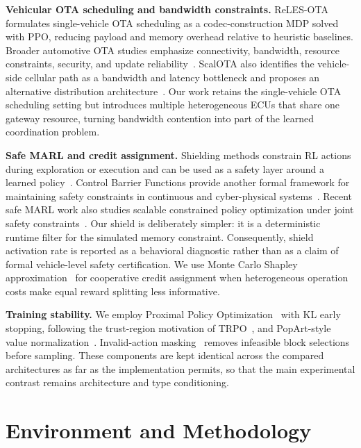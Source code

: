 \documentclass[conference]{IEEEtran}
\begin{document}
\textbf{Vehicular OTA scheduling and bandwidth constraints.}
ReLES-OTA~\cite{b1} formulates single-vehicle OTA scheduling as a codec-construction
MDP solved with PPO, reducing payload and memory overhead relative to heuristic
baselines. Broader automotive OTA studies emphasize connectivity, bandwidth, resource
constraints, security, and update reliability~\cite{halder2020ota,ota_survey}. ScalOTA
also identifies the vehicle-side cellular path as a bandwidth and latency bottleneck
and proposes an alternative distribution architecture~\cite{scalota}. Our work retains
the single-vehicle OTA scheduling setting but introduces multiple heterogeneous ECUs
that share one gateway resource, turning bandwidth contention into part of the learned
coordination problem.

\textbf{Safe MARL and credit assignment.}
Shielding methods constrain RL actions during exploration or execution and can be used
as a safety layer around a learned policy~\cite{alshiekh2018shielding}. Control Barrier
Functions provide another formal framework for maintaining safety constraints in
continuous and cyber-physical systems~\cite{ames2019cbf}. Recent safe MARL work also
studies scalable constrained policy optimization under joint safety constraints~\cite{scalmappol}. Our shield is deliberately simpler: it is a deterministic runtime
filter for the simulated memory constraint. Consequently, shield activation rate is
reported as a behavioral diagnostic rather than as a claim of formal vehicle-level
safety certification. We use Monte Carlo Shapley approximation~\cite{shapley1953,castro2009shapley}
for cooperative credit assignment when heterogeneous operation costs make equal reward
splitting less informative.

\textbf{Training stability.}
We employ Proximal Policy Optimization~\cite{schulman2017ppo} with KL early stopping,
following the trust-region motivation of TRPO~\cite{schulman2015trpo}, and PopArt-style
value normalization~\cite{vanhasselt2016popart}. Invalid-action masking~\cite{huang2020masking}
removes infeasible block selections before sampling. These components are kept identical
across the compared architectures as far as the implementation permits, so that the
main experimental contrast remains architecture and type conditioning.


\section{Environment and Methodology}
\end{document}
